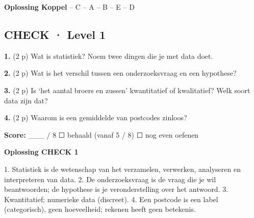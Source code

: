 \begin{oplossing}
\textbf{Oplossing Koppel}  – C  – A  – B  – E  – D
\end{oplossing}

\subsection*{CHECK · Level 1}

\textbf{1.} (2 p) Wat is statistiek? Noem twee dingen die je met data doet. \lijn

\textbf{2.} (2 p) Wat is het verschil tussen een onderzoeksvraag en een hypothese? \lijn

\textbf{3.} (2 p) Is ‘het aantal broers en zussen’ kwantitatief of kwalitatief? Welk soort data zijn dat? \lijn

\textbf{4.} (2 p) Waarom is een gemiddelde van postcodes zinloos? \lijn

\begin{doel}
\textbf{Score:} \_\_\_ / 8 \quad ☐ behaald (vanaf 5 / 8) \quad ☐ nog even oefenen
\end{doel}

\begin{oplossing}
\textbf{Oplossing CHECK 1}

1. Statistiek is de wetenschap van het verzamelen, verwerken, analyseren en interpreteren van data. 2. De onderzoeksvraag is de vraag die je wil beantwoorden; de hypothese is je veronderstelling over het antwoord. 3. Kwantitatief; numerieke data (discreet). 4. Een postcode is een label (categorisch), geen hoeveelheid; rekenen heeft geen betekenis.
\end{oplossing}

